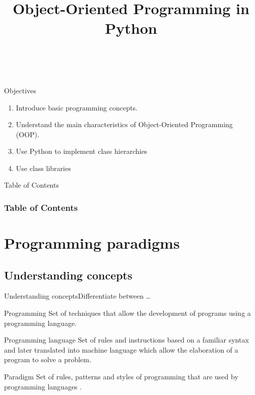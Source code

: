 \documentclass[10pt,compress]{beamer} %
\title[OOP in Python]{Object-Oriented Programming in Python}
\author{\asignatura\\\carrera}
\institute{}
\date{}
\begin{document}
{\titlepageBlue
    \begin{frame}
        \titlepage
    \end{frame}
}

\institute{\asignatura}

\begin{frame}[plain]{}
	\begin{block}{Objectives}
		\begin{enumerate}
		\item Introduce basic programming concepts.
		\item Understand the main characteristics of Object-Oriented Programming (OOP).
		\item Use Python to implement class hierarchies
		\item Use class libraries
		\end{enumerate}
	\end{block}
\end{frame}

{
\begin{frame}[shrink]{Table of Contents}
 \frametitle{Table of Contents}
 \tableofcontents
\end{frame}
}

\section[Programming paradigms]{Programming paradigms}

\subsection[Understanding concepts]{Understanding concepts}

\begin{frame}{Understanding concepts}{Differentiate between \ldots}
			\begin{block}{Programming}
				Set of techniques that allow the development of programs using a programming language.
			\end{block}
			\begin{block}{Programming language}
				Set of rules and instructions based on a familiar syntax and later translated into machine language which allow the elaboration of a program to solve a problem.			\end{block}
			\begin{block}{Paradigm}
Set of rules, patterns and styles of programming that are used by programming languages \cite{Dpto-CCIA-U.A}.
			\end{block}
\end{frame}
\end{document}
